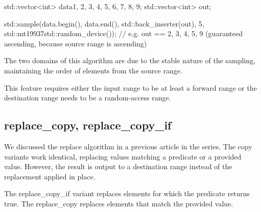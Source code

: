 \begin{box-note}
\begin{cppcode}
std::vector<int> data{1, 2, 3, 4, 5, 6, 7, 8, 9};
std::vector<int> out;

std::sample(data.begin(), data.end(), std::back_inserter(out),
            5, std::mt19937{std::random_device{}()});
// e.g. out == {2, 3, 4, 5, 9} (guaranteed ascending, because source range is ascending)
\end{cppcode}
\end{box-note}

The two domains of this algorithm are due to the stable nature of the sampling, maintaining the order of elements from the source range.

This feature requires either the input range to be at least a forward range or the destination range needs to be a random-access range.

\subsection{replace\_copy, replace\_copy\_if}

We discussed the replace algorithm in a previous article in the series. The copy variants work identical, replacing values matching a predicate or a provided value. However, the result is output to a destination range instead of the replacement applied in place.



The replace\_copy\_if variant replaces elements for which the predicate returns true. The replace\_copy replaces elements that match the provided value.

\begin{box-note}
\end{box-note}

